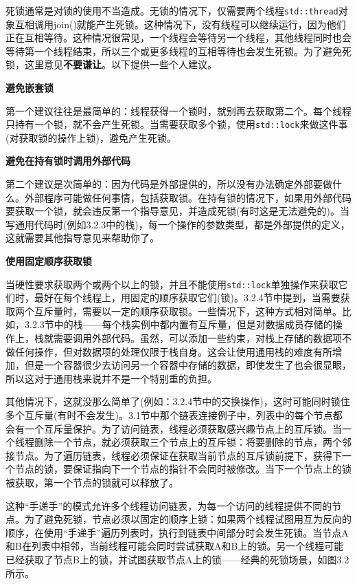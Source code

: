 
死锁通常是对锁的使用不当造成。无锁的情况下，仅需要两个线程\texttt{std::thread}对象互相调用join()就能产生死锁。这种情况下，没有线程可以继续运行，因为他们正在互相等待。这种情况很常见，一个线程会等待另一个线程，其他线程同时也会等待第一个线程结束，所以三个或更多线程的互相等待也会发生死锁。为了避免死锁，这里意见\textbf{不要谦让}。以下提供一些个人建议。

\textbf{避免嵌套锁}

第一个建议往往是最简单的：线程获得一个锁时，就别再去获取第二个。每个线程只持有一个锁，就不会产生死锁。当需要获取多个锁，使用\texttt{std::lock}来做这件事(对获取锁的操作上锁)，避免产生死锁。

\textbf{避免在持有锁时调用外部代码}

第二个建议是次简单的：因为代码是外部提供的，所以没有办法确定外部要做什么。外部程序可能做任何事情，包括获取锁。在持有锁的情况下，如果用外部代码要获取一个锁，就会违反第一个指导意见，并造成死锁(有时这是无法避免的)。当写通用代码时(例如3.2.3中的栈)，每一个操作的参数类型，都是外部提供的定义，这就需要其他指导意见来帮助你了。

\textbf{使用固定顺序获取锁}

当硬性要求获取两个或两个以上的锁，并且不能使用\texttt{std::lock}单独操作来获取它们时，最好在每个线程上，用固定的顺序获取它们(锁)。3.2.4节中提到，当需要获取两个互斥量时，需要以一定的顺序获取锁。一些情况下，这种方式相对简单。比如，3.2.3节中的栈——每个栈实例中都内置有互斥量，但是对数据成员存储的操作上，栈就需要调用外部代码。虽然，可以添加一些约束，对栈上存储的数据项不做任何操作，但对数据项的处理仅限于栈自身。这会让使用通用栈的难度有所增加，但是一个容器很少去访问另一个容器中存储的数据，即使发生了也会很显眼，所以这对于通用栈来说并不是一个特别重的负担。

其他情况下，这就没那么简单了(例如：3.2.4节中的交换操作)，这时可能同时锁住多个互斥量(有时不会发生)。3.1节中那个链表连接例子中，列表中的每个节点都会有一个互斥量保护。为了访问链表，线程必须获取感兴趣节点上的互斥锁。当一个线程删除一个节点，就必须获取三个节点上的互斥锁：将要删除的节点，两个邻接节点。为了遍历链表，线程必须保证在获取当前节点的互斥锁前提下，获得下一个节点的锁，要保证指向下一个节点的指针不会同时被修改。当下一个节点上的锁被获取，第一个节点的锁就可以释放了。

这种“手递手”的模式允许多个线程访问链表，为每一个访问的线程提供不同的节点。为了避免死锁，节点必须以固定的顺序上锁：如果两个线程试图用互为反向的顺序，在使用“手递手”遍历列表时，执行到链表中间部分时会发生死锁。当节点A和B在列表中相邻，当前线程可能会同时尝试获取A和B上的锁。另一个线程可能已经获取了节点B上的锁，并试图获取节点A上的锁——经典的死锁场景，如图3.2所示。

